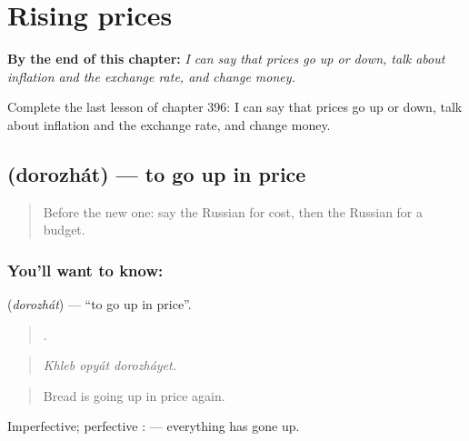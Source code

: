 
\chapter{Rising prices}
\label{ch:ru-rising-prices}

\begin{chapteropening}
\textbf{By the end of this chapter:} \emph{I can say that prices go up or down, talk about inflation and the exchange rate, and change money.}

Complete the last lesson of chapter 396: I can say that prices go up or down, talk about inflation and the exchange rate, and change money.
\end{chapteropening}

\section[\texorpdfstring{\ru{дорожать} (dorozhát)}{дорожать (dorozhát)}]{ (dorozhát) — to go up in price}

\label{lesson:RU-C396-dorozhat}



\begin{quote}
Before the new one: say the Russian for cost, then the Russian for a budget.
\end{quote}

\subsection*{You'll want to know: }
\textbf{} (\emph{dorozhát}) — \textquotedblleft{}to go up in price\textquotedblright{}.

\begin{quote}
  .
\end{quote}

\begin{quote}
\emph{Khleb opyát dorozháyet.}
\end{quote}

\begin{quote}
Bread is going up in price again.
\end{quote}

Imperfective; perfective \emph{}: \emph{ } — everything has gone up.

